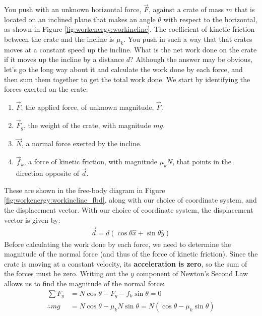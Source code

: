 \begin{example}{\label{ex:workenergy:networkramp}
You push with an unknown horizontal force, $\vec F$, against a crate of mass $m$ that is located on an inclined plane that makes an angle $\theta$ with respect to the horizontal, as shown in Figure \ref{fig:workenergy:workincline}. The coefficient of kinetic friction between the crate and the incline is $\mu_k$. You push in such a way that that crates moves at a constant speed up the incline. What is the net work done on the crate if it moves up the incline by a distance $d$?}
Although the answer may be obvious, let's go the long way about it and calculate the work done by each force, and then sum them together to get the total work done. We start by identifying the forces exerted on the crate:
\begin{enumerate}
\item $\vec F$, the applied force, of unknown magnitude, $\vec F$.
\item $\vec F_g$, the weight of the crate, with magnitude $mg$. 
\item $\vec N$, a normal force exerted by the incline.
\item $\vec f_k$, a force of kinetic friction, with magnitude $\mu_k N$, that points in the direction opposite of $\vec d$. 
\end{enumerate}
These are shown in the free-body diagram in Figure \ref{fig:workenergy:workincline_fbd}, along with our choice of coordinate system, and the displacement vector. 
With our choice of coordinate system, the displacement vector is given by:
\begin{align*}
\vec d = d (\cos\theta \hat x + \sin\theta \hat y)
\end{align*}
Before calculating the work done by each force, we need to determine the magnitude of the normal force (and thus of the force of kinetic friction). Since the crate is moving at a constant velocity, its \textbf{acceleration is zero}, so the sum of the forces must be zero. Writing out the $y$ component of Newton's Second Law allows us to find the magnitude of the normal force:
\begin{align*}
\sum F_y &= N\cos\theta -F_g - f_k\sin\theta = 0\\
\therefore mg &= N\cos\theta-\mu_kN\sin\theta = N(\cos\theta-\mu_k\sin\theta)\\

\end{align*}
\end{example}
